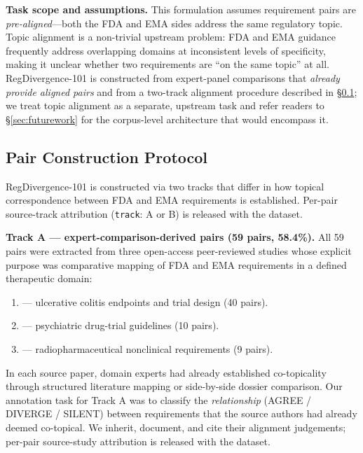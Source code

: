 \documentclass[manuscript]{acmart}
\begin{document}
\textbf{Task scope and assumptions.} This formulation assumes requirement pairs
are \textit{pre-aligned}---both the FDA and EMA sides address the same
regulatory topic. Topic alignment is a non-trivial upstream problem: FDA and
EMA guidance frequently address overlapping domains at inconsistent levels of
specificity, making it unclear whether two requirements are ``on the same
topic'' at all. RegDivergence-101 is constructed from expert-panel comparisons
that \textit{already provide aligned pairs} and from a two-track alignment
procedure described in \S\ref{sec:dataset}; we treat topic alignment as a
separate, upstream task and refer readers to \S\ref{sec:futurework} for the
corpus-level architecture that would encompass it.

\subsection{Pair Construction Protocol}
\label{sec:dataset}

RegDivergence-101 is constructed via two tracks that differ in how topical
correspondence between FDA and EMA requirements is established. Per-pair
source-track attribution (\texttt{track}: A or B) is released with the dataset.

\textbf{Track A --- expert-comparison-derived pairs (59 pairs, 58.4\%).}
All 59 pairs were extracted from three open-access peer-reviewed studies whose
explicit purpose was comparative mapping of FDA and EMA requirements in a
defined therapeutic domain:

\begin{enumerate}
\item \citet{uc2025jcc} --- ulcerative colitis endpoints and trial design
  (40 pairs).
\item \citet{pmc8157504} --- psychiatric drug-trial guidelines (10 pairs).
\item \citet{pmc6529498} --- radiopharmaceutical nonclinical requirements
  (9 pairs).
\end{enumerate}

In each source paper, domain experts had already established co-topicality
through structured literature mapping or side-by-side dossier comparison.
Our annotation task for Track A was to classify the \textit{relationship}
(AGREE / DIVERGE / SILENT) between requirements that the source authors had
already deemed co-topical. We inherit, document, and cite their alignment
judgements; per-pair source-study attribution is released with the dataset.
\end{document}
